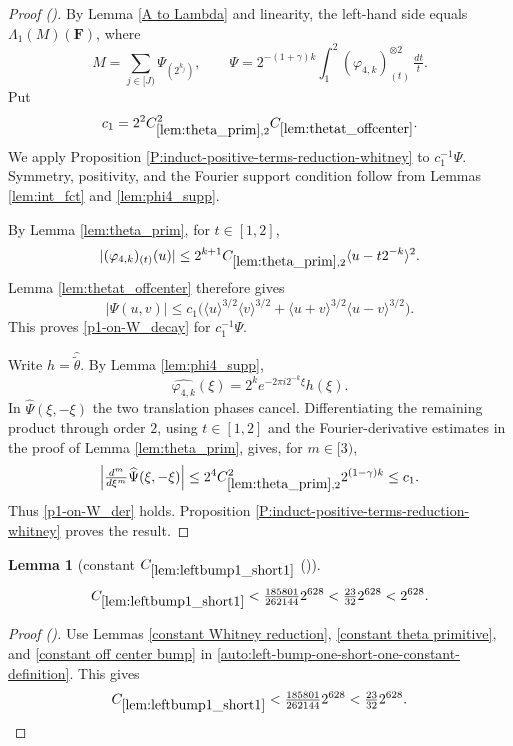 \documentclass[12pt,reqno]{amsart}
\newcommand{\auto}{{({\tiny\faCar})}}
\theoremstyle{plain}
\newtheorem{lemma}[theorem]{Lemma}
\numberwithin{equation}{section}
\theoremstyle{remark}
\newcommand{\uses}[1]{}
\newcommand{\usesdefs}[1]{}
\newcommand{\F}{\mathbf{F}}
\begin{document}
\begin{proof}[Proof \auto]
By Lemma \ref{A to Lambda} and linearity, the left-hand side equals $\Lambda_1(M)(\F)$, where
\[
M=\sum_{j\in[J)}\Psi_{(2^{k_j})},
\qquad
\Psi=2^{-(1+\gamma)k}\int_1^2(\varphi_{4,k})_{(t)}^{\otimes2}\,\tfrac{dt}{t}.
\]
Put
\[
c_1=2^2C_{\ref{lem:theta_prim},2}^2C_{\ref{lem:thetat_offcenter}}.
\]
We apply Proposition \ref{P:induct-positive-terms-reduction-whitney} to $c_1^{-1}\Psi$. Symmetry, positivity, and the Fourier support condition follow from Lemmas \ref{lem:int_fct} and \ref{lem:phi4_supp}.

By Lemma \ref{lem:theta_prim}, for $t\in[1,2]$,
\[
|(\varphi_{4,k})_{(t)}(u)|
\le2^{k+1}C_{\ref{lem:theta_prim},2}
\langle u-t2^{-k}\rangle^2.
\]
Lemma \ref{lem:thetat_offcenter} therefore gives
\[
|\Psi(u,v)|
\le c_1\bigl(
\langle u\rangle^{3/2}\langle v\rangle^{3/2}
+\langle u+v\rangle^{3/2}\langle u-v\rangle^{3/2}
\bigr).
\]
This proves \eqref{p1-on-W_decay} for $c_1^{-1}\Psi$.

Write $h=\widehat{\widetilde\theta}$. By Lemma \ref{lem:phi4_supp},
\[
\widehat{\varphi_{4,k}}(\xi)
=2^ke^{-2\pi i2^{-k}\xi}h(\xi).
\]
In $\widehat\Psi(\xi,-\xi)$ the two translation phases cancel. Differentiating the remaining product through order $2$, using $t\in[1,2]$ and the Fourier-derivative estimates in the proof of Lemma \ref{lem:theta_prim}, gives, for $m\in[3)$,
\[
\left|\tfrac{d^m}{d\xi^m}\widehat\Psi(\xi,-\xi)\right|
\le2^4C_{\ref{lem:theta_prim},2}^2 2^{(1-\gamma)k}
\le c_1.
\]
Thus \eqref{p1-on-W_der} holds. Proposition \ref{P:induct-positive-terms-reduction-whitney} proves the result.
\end{proof}

\begin{lemma}[constant $C_{\ref{lem:leftbump1_short1}}$ \auto]\label{constant left bump one short one}\uses{constant Whitney reduction,constant theta primitive,constant off center bump,lem:leftbump1_short1}\usesdefs{}
\begin{equation}\label{constant left bump one short one bound}
C_{\ref{lem:leftbump1_short1}}
<\tfrac{185801}{262144}2^{628}<\tfrac{23}{32}2^{628}<2^{628}.
\end{equation}
\end{lemma}
\begin{proof}[Proof \auto]
Use Lemmas \ref{constant Whitney reduction}, \ref{constant theta primitive}, and \ref{constant off center bump} in \eqref{auto:left-bump-one-short-one-constant-definition}. This gives
\[
C_{\ref{lem:leftbump1_short1}}
<\tfrac{185801}{262144}2^{628}
<\tfrac{23}{32}2^{628}.
\]
\end{proof}
\end{document}
